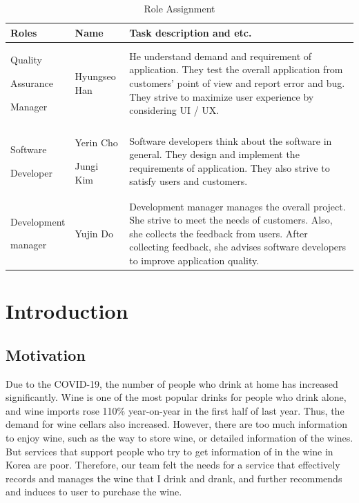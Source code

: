 \documentclass[sigconf, nonacm]{acmart}
\begin{document}
\begin{table}[h]
\caption{Role Assignment}
\def\arraystretch{1.24} \small
\begin{tabular}{|p{1.4cm}|p{1.4cm}|p{4.4cm}|}
\hline
\textbf{Roles} & \textbf{Name} & \textbf{Task description and etc.} \\ \hline
Quality \par Assurance \par Manager&  Hyungseo Han & He understand demand and requirement of application. They test the overall application from customers’ point of view and report error and bug. They strive to maximize user experience by considering UI / UX. \\ \hline

Software \par Developer & Yerin Cho \par Jungi Kim  & Software developers think about the software in general. They design and implement the requirements of application. They also strive to satisfy users and customers. \\ \hline

Development \par manager & Yujin Do & Development manager manages the overall project. She strive to meet the needs of customers. Also, she collects the feedback from users. After collecting feedback, she advises software developers to improve application quality. \\ \hline
\end{tabular}
\end{table}

\section{Introduction}\noindent\subsection{Motivation}
\indent Due to the COVID-19, the number of people who drink at home has increased significantly. Wine is one of the most popular drinks for people who drink alone, and wine imports rose 110\% year-on-year in the first half of last year. Thus, the demand for wine cellars also increased. However, there are too much information to enjoy wine, such as the way to store wine, or detailed information of the wines. But services that support people who try to get information of in the wine in Korea are poor. Therefore, our team felt the needs for a service that effectively records and manages the wine that I drink and drank, and further recommends and induces to user to purchase the wine.\\
 
\end{document}
